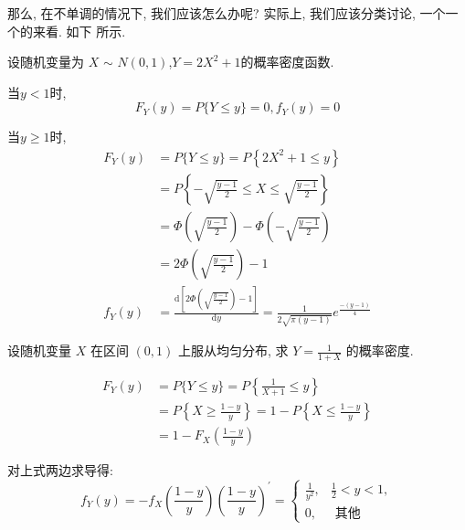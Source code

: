 那么, 在不单调的情况下, 我们应该怎么办呢? 实际上, 我们应该分类讨论, 一个一个的来看. 如下
所示. 

\begin{example}
  设随机变量为 $X$ $\sim$ $N (0, 1)$,$Y = 2X^2+1$的概率密度函数.
\end{example}

\begin{solution}
  当$y < 1$时,
    \[ F_Y(y) = P\{Y \leq y \} = 0,f_Y(y) = 0\]

    \quad 当$y \geq 1$时, 
    \begin{align*}
    F_Y(y) & =  P\{Y \leq y\}=P\left\{2 X^2+1 \leq y\right\} \\
    & =P\left\{-\sqrt{\frac{y-1}{2}} \leq X\right.  \left.\leq \sqrt{\frac{y-1}{2}}\right\}\\
    &=\Phi\left(\sqrt{\frac{y-1}{2}}\right)-\Phi\left(-\sqrt{\frac{y-1}{2}}\right) \\
    & =2 \Phi\left(\sqrt{\frac{y-1}{2}}\right)-1\\
    f_Y(y) &= \frac{\mathrm{d}[2\Phi(\sqrt{\frac{y-1}{2}}) - 1]}{\mathrm{d}y} = \frac{1}{2\sqrt{\pi(y-1)}}e^{\frac{-(y-1)}{4}}
    \end{align*}
\end{solution}

\begin{example}
  设随机变量 $X$ 在区间 $(0,1)$ 上服从均匀分布, 求 $Y=\frac{1}{1+X}$ 的概率密度.
\end{example}
\begin{solution}
  $$
\begin{aligned}
F_Y(y) & =P\{Y \leq y\}=P\left\{\frac{1}{X+1} \leq y\right\} \\
& =P\left\{X \geq \frac{1-y}{y}\right\}=1-P\left\{X \leq \frac{1-y}{y}\right\} \\
& =1-F_X\left(\frac{1-y}{y}\right)
\end{aligned}
$$

对上式两边求导得:
$$
f_Y(y)=-f_X\left(\frac{1-y}{y}\right)\left(\frac{1-y}{y}\right)^{\prime}= \begin{cases}\frac{1}{y^2}, & \frac{1}{2}<y<1, \\ 0, & \text { 其他 }\end{cases}
$$
\end{solution}
